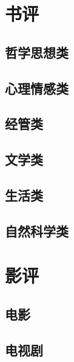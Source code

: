 \documentclass[linespread=1.5]{ctexbook}
\title{\heiti{阅读、电影}}
\author{\kaishu{北方以北}}
\begin{document}
\maketitle

\tableofcontents

\chapter{书评}

\section{哲学思想类}



\section{心理情感类}


\section{经管类}







\section{文学类}












\section{生活类}





\section{自然科学类}




\chapter{影评}
\section{电影}













\section{电视剧}






\end{document}
